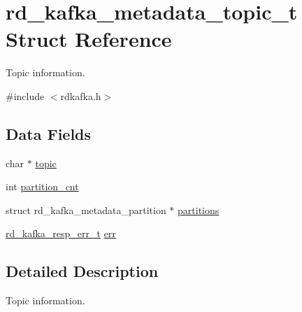 \hypertarget{structrd__kafka__metadata__topic__t}{
\section{rd\_\-kafka\_\-metadata\_\-topic\_\-t Struct Reference}
\label{structrd__kafka__metadata__topic__t}
}


Topic information.  


{\ttfamily \#include $<$rdkafka.h$>$}\subsection*{Data Fields}
\begin{DoxyCompactItemize}
\item 
char $\ast$ \hyperlink{structrd__kafka__metadata__topic__t_a4155a2c939e93b0292398d2590201718}{topic}
\item 
int \hyperlink{structrd__kafka__metadata__topic__t_aaee48d1e35102c49858e46a3a5f6d043}{partition\_\-cnt}
\item 
struct rd\_\-kafka\_\-metadata\_\-partition $\ast$ \hyperlink{structrd__kafka__metadata__topic__t_a62c2ba710cde485ba7157e69bc902a17}{partitions}
\item 
\hyperlink{rdkafka_8h_a03509bab51072c72a8dcf52337e6d5cb}{rd\_\-kafka\_\-resp\_\-err\_\-t} \hyperlink{structrd__kafka__metadata__topic__t_aa178078dba633d6bb1b0e2844addda2a}{err}
\end{DoxyCompactItemize}


\subsection{Detailed Description}
Topic information. 

